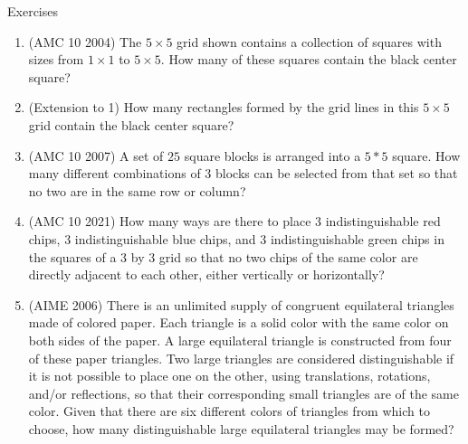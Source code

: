 \begin{xcb}{Exercises}
\begin{enumerate}
\item(AMC 10 2004)  The $5\times 5$ grid shown contains a collection of squares with sizes from $1\times 1$ to $5 \times 5$. How many of these squares contain the black center square?
\begin{center}
\end{center}
\begin{hint}
\end{hint}
\item(Extension to 1)  How many rectangles formed by the grid lines in this $5\times 5$ grid contain the black center square?
\item(AMC 10 2007)  A set of $25$ square blocks is arranged into a $5*5$ square. How many different combinations of $3$ blocks can be selected from that set so that no two are in the same row or column?
\item(AMC 10 2021)  How many ways are there to place $3$ indistinguishable red chips, $3$ indistinguishable blue chips, and $3$ indistinguishable green chips in the squares of a $3$ by $3$ grid so that no two chips of the same color are directly adjacent to each other, either vertically or horizontally?
\begin{hint}
\end{hint}
\item (AIME 2006)  There is an unlimited supply of congruent equilateral triangles made of colored paper. Each triangle is a solid color with the same color on both sides of the paper. A large equilateral triangle is constructed from four of these paper triangles. Two large triangles are considered distinguishable if it is not possible to place one on the other, using translations, rotations, and/or reflections, so that their corresponding small triangles are of the same color. Given that there are six different colors of triangles from which to choose, how many distinguishable large equilateral triangles may be formed?
\begin{hint}

\end{hint}
\end{enumerate}
\end{xcb}
